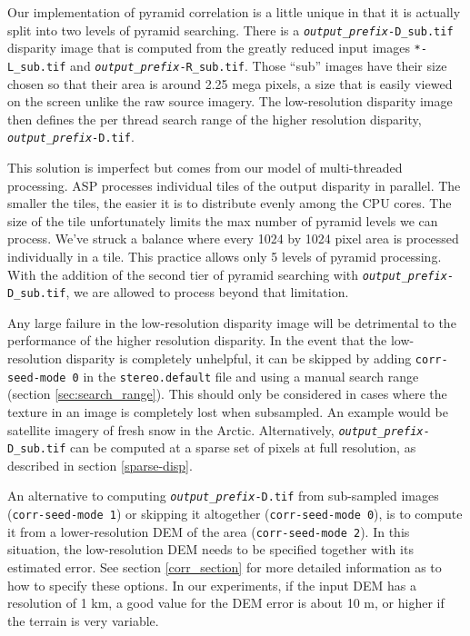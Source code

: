 Our implementation of pyramid correlation is a little unique in that
it is actually split into two levels of pyramid searching. There is a
\texttt{\textit{output\_prefix}-D\_sub.tif} disparity image that is
computed from the greatly reduced input images \texttt{*-L\_sub.tif}
and \texttt{\textit{output\_prefix}-R\_sub.tif}. Those ``sub'' images
have their size chosen so that their area is around 2.25 mega pixels,
a size that is easily viewed on the screen unlike the raw source
imagery. The low-resolution disparity image then defines the per
thread search range of the higher resolution disparity,
\texttt{\textit{output\_prefix}-D.tif}.

This solution is imperfect but comes from our model of multi-threaded
processing. ASP processes individual tiles of the output disparity
in parallel. The smaller the tiles, the easier it is to distribute
evenly among the CPU cores. The size of the tile unfortunately
limits the max number of pyramid levels we can process. We've struck
a balance where every 1024 by 1024 pixel area is processed individually
in a tile. This practice allows only 5 levels of pyramid processing.
With the addition of the second tier of pyramid searching with
\texttt{\textit{output\_prefix}-D\_sub.tif}, we are allowed to
process beyond that limitation.

Any large failure in the low-resolution disparity image will be
detrimental to the performance of the higher resolution disparity. In
the event that the low-resolution disparity is completely unhelpful, it
can be skipped by adding \texttt{corr-seed-mode 0} in the
\texttt{stereo.default} file and using a manual search range (section
\ref{sec:search_range}). This should only be considered in cases where
the texture in an image is completely lost when subsampled. An example
would be satellite imagery of fresh snow in the Arctic. Alternatively,
\texttt{\textit{output\_prefix}-D\_sub.tif} can be computed at a sparse
set of pixels at full resolution, as described in section
\ref{sparse-disp}.

An alternative to computing \texttt{\textit{output\_prefix}-D.tif}
from sub-sampled images (\texttt{corr-seed-mode 1}) or skipping it
altogether (\texttt{corr-seed-mode 0}), is to compute it from a
lower-resolution DEM of the area (\texttt{corr-seed-mode 2}). In this
situation, the low-resolution DEM needs to be specified together with its estimated
error. See section \ref{corr_section} for more detailed information as
to how to specify these options. In our experiments, if the input DEM
has a resolution of 1 km, a good value for the DEM error is about 10 m,
or higher if the terrain is very variable.

